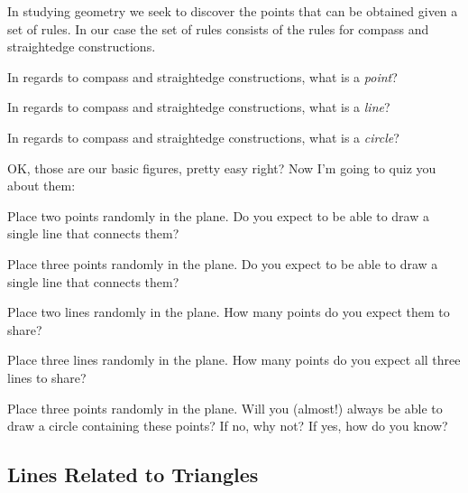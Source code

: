 In studying geometry we seek to discover the points that can be
obtained given a set of rules. In our case the set of rules consists
of the rules for compass and straightedge constructions.

\begin{question} 
In regards to compass and straightedge constructions, what is a
\textit{point}?
\end{question}
\QM

\begin{question}
In regards to compass and straightedge constructions, what is a
\textit{line}?
\end{question}
\QM


\begin{question}
In regards to compass and straightedge constructions, what is a
\textit{circle}?
\end{question}
\QM


OK, those are our basic figures, pretty easy right? Now I'm going to
quiz you about them:

\begin{question} 
Place two points randomly in the plane. Do you expect to be able to
draw a single line that connects them?
\end{question}
\QM

\begin{question} 
Place three points randomly in the plane. Do you expect to be able to
draw a single line that connects them?
\end{question}
\QM

\begin{question} 
Place two lines randomly in the plane. How many points do you expect
them to share?
\end{question}
\QM


\begin{question} 
Place three lines randomly in the plane. How many points do you expect
all three lines to share?
\end{question}
\QM


\begin{question} 
Place three points randomly in the plane. Will you (almost!) always be
able to draw a circle containing these points? If no, why not? If yes,
how do you know?
\end{question}
\QM




\subsection{Lines Related to Triangles}

